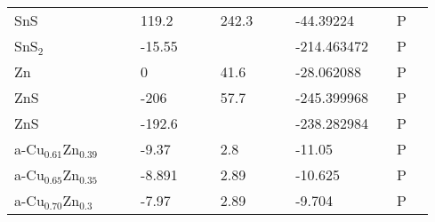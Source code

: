 \documentclass{article}
\begin{document}
\begin{center}
\begin{longtable}{|l|p{2.5cm}|l|p{2.5cm}|l|l|p{2.5cm}|l|l|p{2.5cm}|l|l|l|}
SnS                &                            &                   & 119.2               &     & \citep{WagmanDonaldD1969}                    & 242.3              &     & \citep{Hellwege1984}                         & -44.39224                           &     &    P               \\
SnS$_2$              &                            &                   & -15.55              &     &                                              &                    &     &                                              & -214.463472                         &     &     P              \\
Zn                 &                            &                   & 0                   &     & \citep{Haynes2013}                           & 41.6               &     & \citep{Haynes2013}                           & -28.062088                          &     &   P                \\
ZnS                &                            &                   & -206                &     & \citep{Haynes2013}                           & 57.7               &     & \citep{Haynes2013}                           & -245.399968                         &     &   P                \\
ZnS                &                            &                   & -192.6              &     & \citep{Haynes2013}                           &                    &     &                                              & -238.282984                         &     &    P               \\
a-Cu$_{0.61}$Zn$_{0.39}$     &                            &                   & -9.37               &     & \citep{KubaschewskiCatterallJohnAshley.1956} & 2.8                &     & \citep{KubaschewskiCatterallJohnAshley.1956} & -11.05                              &     & P                 \\
a-Cu$_{0.65}$Zn$_{0.35}$     &                            &                   & -8.891              &     & \citep{KubaschewskiCatterallJohnAshley.1956} & 2.89               &     & \citep{KubaschewskiCatterallJohnAshley.1956} & -10.625                             &     & P                 \\
a-Cu$_{0.70}$Zn$_{0.3}$      &                            &                   & -7.97               &     & \citep{KubaschewskiCatterallJohnAshley.1956} & 2.89               &     & \citep{KubaschewskiCatterallJohnAshley.1956} & -9.704                              &     & P                 \\

\end{longtable}
\end{center}
\end{document}
